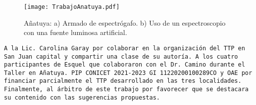 \documentclass[baaa]{baaa}
\begin{document}
\begin{figure}[!t]
\centering
\texttt{[image: TrabajoAnatuya.pdf]}
\caption{A\~natuya: a) Armado de espectr\'ogafo. b) Uso de un espectroscopio con una fuente luminosa artificial.}
\label{AnatuyaTrab}
\end{figure}




\begin{acknowledgement}
\texttt{A la Lic. Carolina Garay por colaborar en la organizaci\'on del TTP en San Juan capital y compartir una clase de su autor\'ia. A los cuatro participantes de Esquel que colaboraron con el Dr. Camino durante el Taller en A\~natuya. PIP CONICET 2021-2023 GI 11220200100289CO y OAE por financiar parcialmente el TTP desarrollado en las tres localidades. Finalmente, al \'arbitro de este trabajo por favorecer que se destacara su contenido con las sugerencias propuestas.}
\end{acknowledgement}



\small

 
\end{document}
